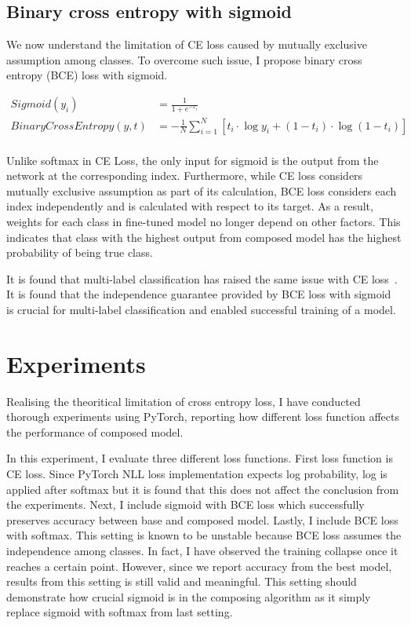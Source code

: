 \documentclass{article}
\begin{document}
\subsection{Binary cross entropy with sigmoid}

We now understand the limitation of CE loss caused by mutually exclusive assumption among classes. To overcome such issue, I propose binary cross entropy (BCE) loss with sigmoid.

\begin{align*}
Sigmoid(y_i) &= \frac{1}{1 + e^{-x_i}} \\
BinaryCrossEntropy(y, t) & = -\frac{1}{N}\sum_{i=1}^N \left[ t_i \cdot \log y_i + (1 - t_i) \cdot \log (1 - t_i) \right] \\
\end{align*}

Unlike softmax in CE Loss, the only input for sigmoid is the output from the network at the corresponding index. Furthermore, while CE loss considers mutually exclusive assumption as part of its calculation, BCE loss considers each index independently and is calculated with respect to its target. As a result, weights for each class in fine-tuned model no longer depend on other factors. This indicates that class with the highest output from composed model has the highest probability of being true class.

It is found that multi-label classification has raised the same issue with CE loss~\cite{liu2017deep}. It is found that the independence guarantee provided by BCE loss with sigmoid is crucial for multi-label classification and enabled successful training of a model.

\section{Experiments}

Realising the theoritical limitation of cross entropy loss, I have conducted thorough experiments using PyTorch, reporting how different loss function affects the performance of composed model.

In this experiment, I evaluate three different loss functions. First loss function is CE loss. Since PyTorch NLL loss implementation expects log probability, log is applied after softmax but it is found that this does not affect the conclusion from the experiments. Next, I include sigmoid with BCE loss which successfully preserves accuracy between base and composed model. Lastly, I include BCE loss with softmax. This setting is known to be unstable because BCE loss assumes the independence among classes. In fact, I have observed the training collapse once it reaches a certain point. However, since we report accuracy from the best model, results from this setting is still valid and meaningful. This setting should demonstrate how crucial sigmoid is in the composing algorithm as it simply replace sigmoid with softmax from last setting.
\end{document}
